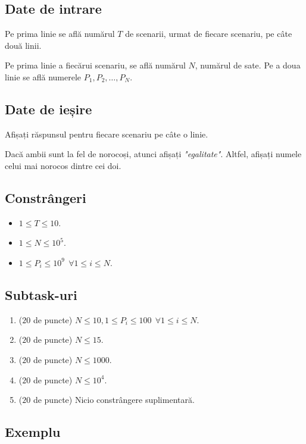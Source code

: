 \documentclass[12pt,a4paper]{article}
\begin{document}
\subsection*{Date de intrare}

Pe prima linie se află numărul $T$ de scenarii, urmat de fiecare scenariu, pe câte două linii.

Pe prima linie a fiecărui scenariu, se află numărul $N$, numărul de sate.
Pe a doua linie se află numerele $P_1, P_2, \dots, P_N$.

\subsection*{Date de ieșire}

Afișați răspunsul pentru fiecare scenariu pe câte o linie.

Dacă ambii sunt la fel de norocoși, atunci afișați \textit{"egalitate"}. Altfel, afișați numele celui mai norocos dintre cei doi.

\subsection*{Constrângeri}

\begin{itemize}
    \item $1 \leq T \leq 10$.
    \item $1 \leq N \leq 10^5$.
    \item $1 \leq P_i \leq 10^9 \ \ \forall 1 \leq i \leq N$.
\end{itemize}


\subsection*{Subtask-uri}

\begin{enumerate}
    \item ($20$ de puncte) $N \leq 10, 1 \leq P_i \leq 100 \ \ \forall 1 \leq i \leq N$.
    \item ($20$ de puncte) $N \leq 15$.
    \item ($20$ de puncte) $N \leq 1000$.
    \item ($20$ de puncte) $N \leq 10^4$.
    \item ($20$ de puncte) Nicio constrângere suplimentară.
\end{enumerate}

\subsection*{Exemplu}
\end{document}
